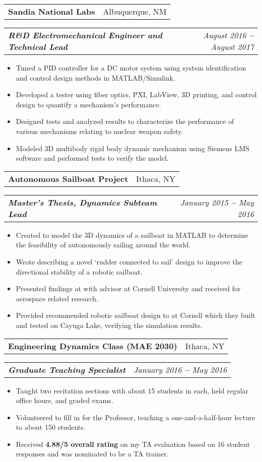\documentclass[letterpaper,11pt]{article}
\makeatletter
\def\vspaceAfterBullets{3pt} %
\def\bulletIndent{15pt} %
\newcommand{\bulletItem}[1]{
  \item\small{
    {#1}
  }
}
\newcommand{\companyNameAndLocationHeading}[2]{
  \item 
    \begin{tabular*}{1.0\textwidth}[b]{l@{\extracolsep{\fill}}r}
      \textbf{#1} & #2
    \end{tabular*}
}
\newcommand{\titleAndDateHeading}[2]{
    \item
    \begin{tabular*}{1.0\textwidth}[b]{l@{\extracolsep{\fill}}r}
      \textit{\textbf{\small#1}} & \textit{\small #2}
    \end{tabular*}
}
\newcommand{\outerBulletListStart}{\begin{itemize}[leftmargin=\bulletIndent]}
\newcommand{\outerBulletListEnd}{\end{itemize}\vspace{\vspaceAfterBullets}}
\newcommand{\bref}[2]{\href{#1}{\color{blue}{#2}}}
\makeatother
\begin{document}
\companyNameAndLocationHeading
{Sandia National Labs}{Albuquerque, NM}
\titleAndDateHeading
{R\&D Electromechanical Engineer and Technical Lead}{August 2016 \textbf{--} August 2017}
\outerBulletListStart
\bulletItem{Tuned a PID controller for a DC motor system using system identification and control design methods in MATLAB/Simulink.}
\bulletItem{Developed a tester using fiber optics, PXI, LabView, 3D printing, and control design to quantify a mechanism’s performance.}
\bulletItem{Designed tests and analyzed results to characterize the performance of various mechanisms relating to nuclear weapon safety.}
\bulletItem{Modeled 3D multibody rigid body dynamic mechanism using Siemens LMS software and performed tests to verify the model.}
\outerBulletListEnd

\companyNameAndLocationHeading
{Autonomous Sailboat Project}{Ithaca, NY}
\titleAndDateHeading
{Master’s Thesis, Dynamics Subteam Lead}{January 2015 \textbf{--} May 2016}
\outerBulletListStart
\bulletItem{Created \bref{https://github.com/jam643/SailboatSim3D/tree/master}{a simulation framework} to model the 3D dynamics of a sailboat in MATLAB to determine the feasibility of autonomously sailing around the world.}
\bulletItem{Wrote \bref{https://bpb-us-w2.wpmucdn.com/sites.coecis.cornell.edu/dist/5/91/files/2017/06/Semester-Report-Spring-2016-Jesse-Miller-1e485cb.pdf}{a thesis paper} describing a novel ‘rudder connected to sail’ design to improve the directional stability of a robotic sailboat.}
\bulletItem{Presented findings at \bref{https://robotics.cornell.edu/2019/08/14/a-directionally-self-stable-robotic-sail-boat-concept-and-simulations/}{a robotics seminar} with advisor \bref{http://ruina.tam.cornell.edu/}{Andy Ruina} at Cornell University and received \bref{https://www.mae.cornell.edu/news/sibley-school-mechanical-aerospace-engineering-student-awards-0}{the Kelly Prize} for aerospace related research.}
\bulletItem{Provided recommended robotic sailboat design to \bref{https://cusail.com/}{CUSail project team} at Cornell which they built and tested on Cayuga Lake, verifying the simulation results.}
\outerBulletListEnd

\companyNameAndLocationHeading
{Engineering Dynamics Class (MAE 2030)}{Ithaca, NY}
\titleAndDateHeading
{Graduate Teaching Specialist}{January 2016 \textbf{--} May 2016}
\outerBulletListStart
\bulletItem{Taught two recitation sections with about 15 students in each, held regular office hours, and graded exams.}
\bulletItem{Volunteered to fill in for the Professor, teaching a one-and-a-half-hour lecture to about 150 students.}
\bulletItem{Received \textbf{4.88/5 overall rating} on my TA evaluation based on 16 student responses and was nominated to be a TA trainer.}
\outerBulletListEnd
\end{document}

